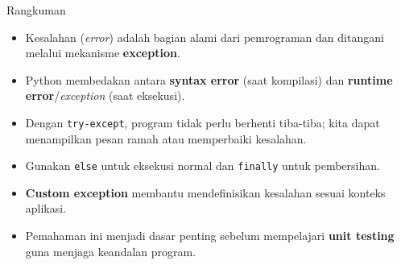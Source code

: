 \documentclass[aspectratio=169, table]{beamer}
\begin{document}
\begin{frame}{Rangkuman}
\vspace*{15pt}
\begin{itemize}
  \item Kesalahan (\textit{error}) adalah bagian alami dari pemrograman dan ditangani melalui mekanisme \textbf{exception}.
  \item Python membedakan antara \textbf{syntax error} (saat kompilasi) dan \textbf{runtime error}/\textit{exception} (saat eksekusi).
  \item Dengan \texttt{try-except}, program tidak perlu berhenti tiba-tiba; kita dapat menampilkan pesan ramah atau memperbaiki kesalahan.
  \item Gunakan \texttt{else} untuk eksekusi normal dan \texttt{finally} untuk pembersihan.
  \item \textbf{Custom exception} membantu mendefinisikan kesalahan sesuai konteks aplikasi.
  \item Pemahaman ini menjadi dasar penting sebelum mempelajari \textbf{unit testing} guna menjaga keandalan program.
\end{itemize}
\end{frame}
\end{document}

